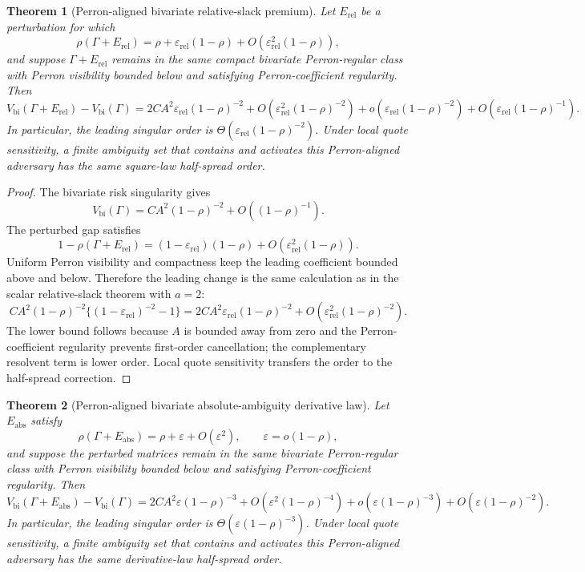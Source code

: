 \documentclass[11pt]{article}
\newtheorem{theorem}{Theorem}
\newcommand{\eps}{\varepsilon}
\begin{document}
\begin{theorem}[Perron-aligned bivariate relative-slack premium]
Let $E_{\mathrm{rel}}$ be a perturbation for which
\[
\rho(\Gamma+E_{\mathrm{rel}})
=
\rho+\eps_{\mathrm{rel}}(1-\rho)+O(\eps_{\mathrm{rel}}^2(1-\rho)),
\]
and suppose $\Gamma+E_{\mathrm{rel}}$ remains in the same compact bivariate
Perron-regular class with Perron visibility bounded below and satisfying
Perron-coefficient regularity. Then
\[
V_{\mathrm{bi}}(\Gamma+E_{\mathrm{rel}})
-V_{\mathrm{bi}}(\Gamma)
=
2CA^2\eps_{\mathrm{rel}}(1-\rho)^{-2}
+O(\eps_{\mathrm{rel}}^2(1-\rho)^{-2})
+o(\eps_{\mathrm{rel}}(1-\rho)^{-2})
+O(\eps_{\mathrm{rel}}(1-\rho)^{-1}).
\]
In particular, the leading singular order is
$\Theta(\eps_{\mathrm{rel}}(1-\rho)^{-2})$. Under local quote sensitivity, a
finite ambiguity set that contains and activates this Perron-aligned adversary
has the same square-law half-spread order.
\end{theorem}

\begin{proof}
The bivariate risk singularity gives
\[
V_{\mathrm{bi}}(\Gamma)=C A^2(1-\rho)^{-2}+O((1-\rho)^{-1}).
\]
The perturbed gap satisfies
\[
1-\rho(\Gamma+E_{\mathrm{rel}})
=(1-\eps_{\mathrm{rel}})(1-\rho)+O(\eps_{\mathrm{rel}}^2(1-\rho)).
\]
Uniform Perron visibility and compactness keep the leading coefficient bounded
above and below. Therefore the leading change is the same calculation as in the
scalar relative-slack theorem with $a=2$:
\[
C A^2(1-\rho)^{-2}\{(1-\eps_{\mathrm{rel}})^{-2}-1\}
=
2 C A^2\eps_{\mathrm{rel}}(1-\rho)^{-2}
+O(\eps_{\mathrm{rel}}^2(1-\rho)^{-2}).
\]
The lower bound follows because $A$ is bounded away from zero and the
Perron-coefficient regularity prevents first-order cancellation; the
complementary resolvent term is lower order. Local quote sensitivity transfers
the order to the half-spread correction.
\end{proof}

\begin{theorem}[Perron-aligned bivariate absolute-ambiguity derivative law]
Let $E_{\mathrm{abs}}$ satisfy
\[
\rho(\Gamma+E_{\mathrm{abs}})
=\rho+\eps+O(\eps^2),
\qquad \eps=o(1-\rho),
\]
and suppose the perturbed matrices remain in the same bivariate Perron-regular
class with Perron visibility bounded below and satisfying Perron-coefficient
regularity. Then
\[
V_{\mathrm{bi}}(\Gamma+E_{\mathrm{abs}})
-V_{\mathrm{bi}}(\Gamma)
=
2CA^2\eps(1-\rho)^{-3}
+O(\eps^2(1-\rho)^{-4})
+o(\eps(1-\rho)^{-3})
+O(\eps(1-\rho)^{-2}).
\]
In particular, the leading singular order is
$\Theta(\eps(1-\rho)^{-3})$. Under local quote sensitivity, a finite ambiguity
set that contains and activates this Perron-aligned adversary has the same
derivative-law half-spread order.
\end{theorem}
\end{document}
